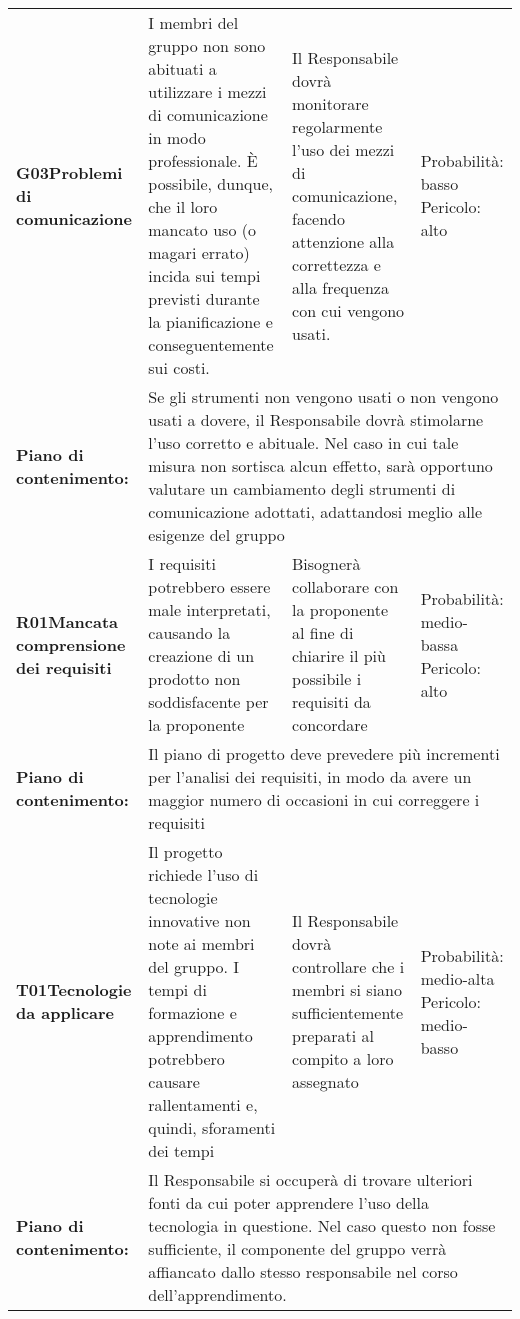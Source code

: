 \begin{longtable}{>{\bfseries}p{2.5cm} p{4.5cm} p{4.5cm} p{2.5cm}}
		\hline
		G03\newline Problemi di comunicazione
		&	I membri del gruppo non sono abituati a utilizzare i mezzi di comunicazione in modo professionale. \`E possibile, dunque, che il loro mancato uso (o magari errato) incida sui tempi previsti durante la pianificazione e conseguentemente sui costi. 
		& Il Responsabile dovrà monitorare regolarmente l'uso dei mezzi di comunicazione, facendo attenzione alla correttezza e alla frequenza con cui vengono usati.
		& Probabilità: basso \newline Pericolo: alto \\
		\rowcolor{LightGray}
		Piano di contenimento: 
		& \multicolumn{3}{p{12.5cm}}{Se gli strumenti non vengono usati o non vengono usati a dovere, il Responsabile dovrà stimolarne l'uso corretto e abituale. Nel caso in cui tale misura non sortisca alcun effetto, sarà opportuno valutare un cambiamento degli strumenti di comunicazione adottati, adattandosi meglio alle esigenze del gruppo}\\[0.5cm]

		\hline
		R01\newline Mancata comprensione dei requisiti 
		& I requisiti potrebbero essere male interpretati, causando la creazione di un prodotto non soddisfacente per la proponente
		& Bisognerà collaborare con la proponente al fine di chiarire il più possibile i requisiti da concordare &
		  Probabilità: medio-bassa \newline Pericolo: alto \\
		\rowcolor{LightGray}
		Piano di contenimento: 
		& \multicolumn{3}{p{12.5cm}}{Il piano di progetto deve prevedere più incrementi per l'analisi dei requisiti, in modo da avere un maggior numero di occasioni in cui correggere i requisiti}\\[0.5cm]

		\hline
		T01\newline Tecnologie da applicare
		& Il progetto richiede l'uso di tecnologie innovative non note ai membri del gruppo. I tempi di formazione e apprendimento potrebbero causare rallentamenti e, quindi, sforamenti dei tempi 
		& Il Responsabile dovrà controllare che i membri si siano sufficientemente preparati al compito a loro assegnato 
		& Probabilità: medio-alta \newline Pericolo: medio-basso \\
		\rowcolor{LightGray}
		Piano di contenimento: 
		& \multicolumn{3}{p{12.5cm}}{Il Responsabile si occuperà di trovare ulteriori fonti da cui poter apprendere l'uso della tecnologia in questione. Nel caso questo non fosse sufficiente, il componente del gruppo verrà affiancato dallo stesso responsabile nel corso dell'apprendimento.}\\[0.5cm]


\end{longtable}
